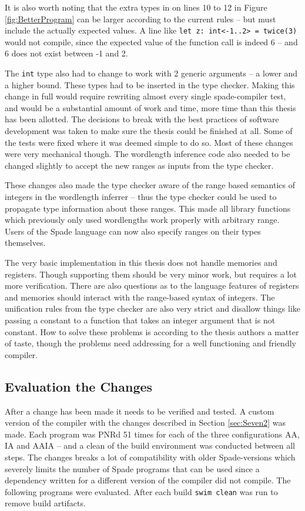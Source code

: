 It is also worth noting that the extra types in on lines 10 to 12 in Figure \ref{fig:BetterProgram} can be larger according to the current rules -- but must include the actually expected values. A line like \verb+let z: int<-1..2> = twice(3)+ would not compile, since the expected value of the function call is indeed 6 -- and 6 does not exist between -1 and 2.

The \verb+int+ type also had to change to work with 2 generic arguments -- a lower and a higher bound. These types had to be inserted in the type checker. Making this change in full would require rewriting almost every single spade-compiler test, and would be a substantial amount of work and time, more time than this thesis has been allotted. The decisions to break with the best practices of software development was taken to make sure the thesis could be finished at all. Some of the tests were fixed where it was deemed simple to do so. Most of these changes were very mechanical though. The wordlength inference code also needed to be changed slightly to accept the new ranges as inputs from the type checker.

These changes also made the type checker aware of the range based semantics of integers in the wordlength inferrer -- thus the type checker could be used to propagate type information about these ranges. This made all library functions which previously only used wordlengths work properly with arbitrary range. Users of the Spade language can now also specify ranges on their types themselves.

The very basic implementation in this thesis does not handle memories and registers. Though supporting them should be very minor work, but requires a lot more verification. There are also questions as to the language features of registers and memories should interact with the range-based syntax of integers. The unification rules from the type checker are also very strict and disallow things like passing a constant to a function that takes an integer argument that is not constant. How to solve these problems is according to the thesis authors a matter of taste, though the problems need addressing for a well functioning and friendly compiler.

\subsection{Evaluation the Changes}
After a change has been made it needs to be verified and tested. A custom version of the compiler with the changes described in Section \ref{sec:Seven2} was made. Each program was PNRd 51 times for each of the three configurations AA, IA and AAIA -- and a clean of the build environment was conducted between all steps. The changes breaks a lot of compatibility with older Spade-versions which severely limits the number of Spade programs that can be used since a dependency written for a different version of the compiler did not compile. The following programs were evaluated. After each build \verb+swim clean+ was run to remove build artifacts.

